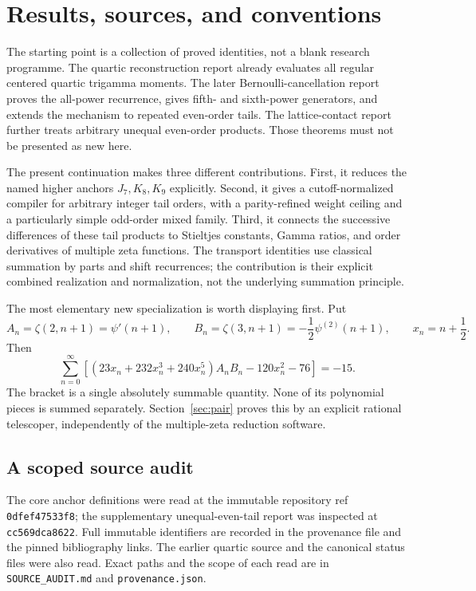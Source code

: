 \documentclass[11pt,letterpaper]{article}
\numberwithin{equation}{section}
\theoremstyle{definition}\newtheorem{definition}[theorem]{Definition}
\theoremstyle{remark}\newtheorem{remark}[theorem]{Remark}
\newcommand{\sref}[1]{\texttt{#1}}
\begin{document}
\section{Results, sources, and conventions}
\label{sec:scope}

The starting point is a collection of proved identities, not a blank
research programme. The quartic reconstruction report \cite{Quartic}
already evaluates all regular centered quartic trigamma moments.
The later Bernoulli-cancellation report \cite{Bernoulli} proves the
all-power recurrence, gives fifth- and sixth-power generators, and
extends the mechanism to repeated even-order tails. The lattice-contact
report \cite{Lattice} further treats arbitrary unequal even-order
products. Those theorems must not be presented as new here.

The present continuation makes three different contributions. First,
it reduces the named higher anchors $J_7,K_8,K_9$ explicitly. Second,
it gives a cutoff-normalized compiler for arbitrary integer tail orders,
with a parity-refined weight ceiling and a particularly simple odd-order
mixed family. Third, it connects the successive differences of these
tail products to Stieltjes constants, Gamma ratios, and order derivatives
of multiple zeta functions. The transport identities use classical
summation by parts and shift recurrences; the contribution is their
explicit combined realization and normalization, not the underlying
summation principle.

The most elementary new specialization is worth displaying first.
Put
\begin{equation}\label{eq:AB}
 A_n=\zeta(2,n+1)=\psi'(n+1),\qquad
 B_n=\zeta(3,n+1)=-\frac12\psi^{(2)}(n+1),\qquad
 x_n=n+\frac12.
\end{equation}
Then
\begin{equation}\label{eq:intro-rational}
\boxed{\displaystyle
 \sum_{n=0}^{\infty}\left[
 (23x_n+232x_n^3+240x_n^5)A_nB_n-120x_n^2-76
 \right]=-15.}
\end{equation}
The bracket is a single absolutely summable quantity. None of its
polynomial pieces is summed separately. Section~\ref{sec:pair} proves
this by an explicit rational telescoper, independently of the
multiple-zeta reduction software.

\subsection{A scoped source audit}

The core anchor definitions were read at the immutable repository ref
\sref{0dfef47533f8}; the supplementary unequal-even-tail report was
inspected at \sref{cc569dca8622}. Full immutable identifiers are
recorded in the provenance file and the pinned bibliography links.
The earlier quartic source and the canonical status files were also
read. Exact paths and the scope of each read are in
\sref{SOURCE\_AUDIT.md} and \sref{provenance.json}.
\end{document}
